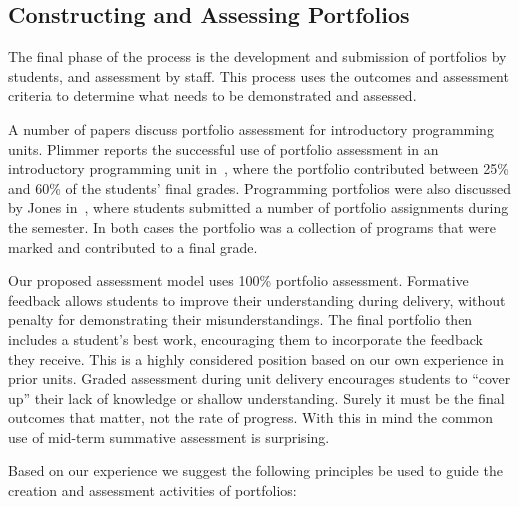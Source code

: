 
\subsection{Constructing and Assessing Portfolios} %
\label{sub:assessing_the_portfolios}

The final phase of the process is the development and submission of portfolios by students, and assessment by staff. This process uses the outcomes and assessment criteria to determine what needs to be demonstrated and assessed. 

A number of papers discuss portfolio assessment for introductory programming units. Plimmer reports the successful use of portfolio assessment in an introductory programming unit in~\cite{Plimmer:2000}, where the portfolio contributed between 25\% and 60\% of the students' final grades. Programming portfolios were also discussed by Jones in~\cite{Jones:2010}, where students submitted a number of portfolio assignments during the semester. In both cases the portfolio was a collection of programs that were marked and contributed to a final grade.

Our proposed assessment model uses 100\% portfolio assessment. Formative feedback allows students to improve their understanding during delivery, without penalty for demonstrating their misunderstandings. The final portfolio then includes a student's best work, encouraging them to incorporate the feedback they receive. This is a highly considered position based on our own experience in prior units. Graded assessment during unit delivery encourages students to ``cover up'' their lack of knowledge or shallow understanding. Surely it must be the final outcomes that matter, not the rate of progress. With this in mind the common use of mid-term summative assessment is surprising.


Based on our experience we suggest the following principles be used to guide the creation and assessment activities of portfolios:

